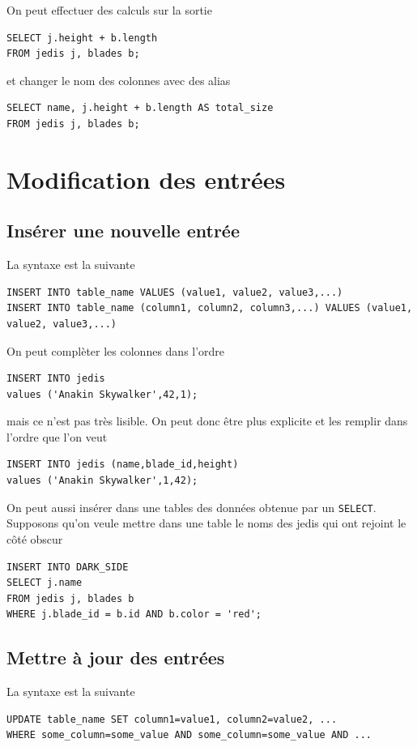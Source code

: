 On peut effectuer des calculs sur la sortie
\begin{lstlisting}
SELECT j.height + b.length
FROM jedis j, blades b;
\end{lstlisting}
et changer le nom des colonnes avec des alias
\begin{lstlisting}
SELECT name, j.height + b.length AS total_size
FROM jedis j, blades b;
\end{lstlisting}

\section{Modification des entrées}
\subsection{Insérer une nouvelle entrée}
La syntaxe est la suivante
\begin{lstlisting}
INSERT INTO table_name VALUES (value1, value2, value3,...)
INSERT INTO table_name (column1, column2, column3,...) VALUES (value1, value2, value3,...)
\end{lstlisting}

On peut complèter les colonnes dans l'ordre
\begin{lstlisting}
INSERT INTO jedis
values ('Anakin Skywalker',42,1);
\end{lstlisting}
mais ce n'est pas très lisible.
On peut donc être plus explicite et les remplir dans l'ordre que l'on veut
\begin{lstlisting}
INSERT INTO jedis (name,blade_id,height)
values ('Anakin Skywalker',1,42);
\end{lstlisting}

On peut aussi insérer dans une tables
des données obtenue par un \lstinline|SELECT|.
Supposons qu'on veule mettre dans une table le noms des jedis qui ont
rejoint le côté obscur
\begin{lstlisting}
INSERT INTO DARK_SIDE
SELECT j.name
FROM jedis j, blades b
WHERE j.blade_id = b.id AND b.color = 'red';
\end{lstlisting}

\subsection{Mettre à jour des entrées}
La syntaxe est la suivante
\begin{lstlisting}
UPDATE table_name SET column1=value1, column2=value2, ...
WHERE some_column=some_value AND some_column=some_value AND ...
\end{lstlisting}

